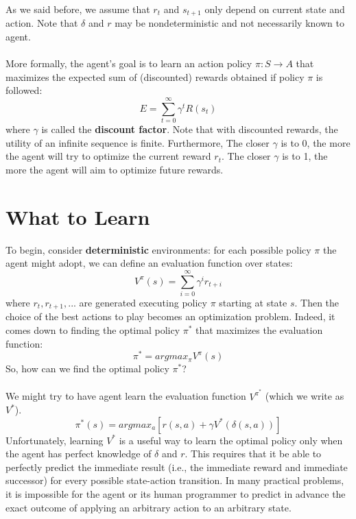 As we said before, we assume that $r_t$ and $s_{t+1}$ only depend on current state and action. Note that $\delta$ and $r$ may be nondeterministic and not necessarily known to agent.\\\\
More formally, the agent's goal is to learn an action policy $\pi: S \rightarrow A$ that maximizes the expected sum of (discounted) rewards obtained if policy $\pi$ is followed:
\[E=\sum_{t=0}^\infty \gamma^t R(s_t)\]
where $\gamma$ is called the \textbf{discount factor}. Note that with discounted rewards, the utility of an infinite sequence is finite. Furthermore, The closer $\gamma$ is to 0, the more the agent will try to optimize the current reward $r_t$. The closer $\gamma$ is to 1, the more the agent will aim to optimize future rewards.

\section{What to Learn}
To begin, consider \textbf{deterministic} environments: for each possible policy $\pi$ the agent might adopt, we can define an evaluation function over states:
\[V^\pi(s) = \sum_{i=0}^\infty \gamma^i r_{t+i}\]
where $r_t, r_{t+1}, ...$ are generated executing policy $\pi$ starting at state $s$. Then the choice of the best actions to play becomes an optimization problem. Indeed, it comes down to finding the optimal policy $\pi^*$ that maximizes the evaluation function:
\[\pi^* = argmax_\pi V^\pi (s)\]
So, how can we find the optimal policy $\pi^*$?\\\\
We might try to have agent learn the evaluation function $V^{\pi^*}$
(which we write as $V^*$).
\begin{equation}
    \pi^* (s) = argmax_a[r(s,a) + \gamma V^*(\delta(s,a))]
\end{equation}
Unfortunately, learning $V^*$ is a useful way to learn the optimal policy only when the agent has perfect knowledge of $\delta$ and $r$. This requires that it be  able to perfectly  predict the immediate result (i.e., the immediate reward and immediate successor) for every possible state-action transition. In many practical problems, it is impossible for the agent or its human programmer to predict in advance the exact outcome of applying an arbitrary action to an  arbitrary state.

